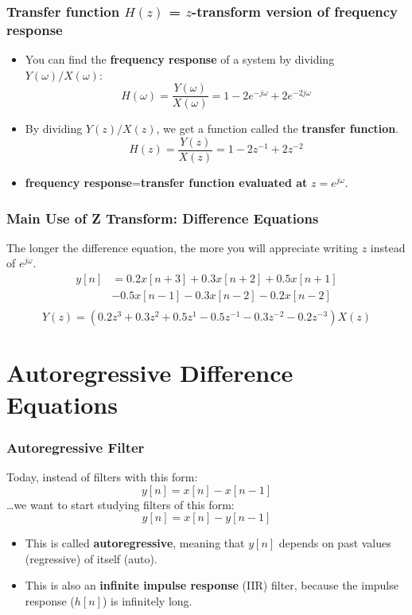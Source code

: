 \documentclass{beamer}
\begin{document}
\begin{frame}
  \frametitle{Transfer function $H(z)$ = $z$-transform version of frequency response}
  
  \begin{itemize}
  \item You can find the \textbf{frequency response} of a system by
    dividing $Y(\omega)/X(\omega)$:
    \[
    H(\omega)=\frac{Y(\omega)}{X(\omega)} = 1-2e^{-j\omega}+2e^{-2j\omega}
    \]
  \item By dividing $Y(z)/X(z)$, we get a function called the
    \textbf{transfer function}.  
    \[
    H(z) = \frac{Y(z)}{X(z)} = 1-2z^{-1}+2z^{-2}
    \]
  \item \textbf{frequency response}=\textbf{transfer function evaluated at} $z=e^{j\omega}$.
  \end{itemize}
\end{frame}

\begin{frame}
  \frametitle{Main Use of Z Transform: Difference Equations}
  
  The longer the difference equation, the more you will appreciate
  writing $z$ instead of $e^{j\omega}$.
  \begin{align*}
    y[n] &= 0.2x[n+3]+0.3x[n+2]+0.5x[n+1]\\
    &-0.5x[n-1]-0.3x[n-2]-0.2x[n-2]\\
  \end{align*}
  \[
  Y(z) = \left(0.2z^{3}+0.3z^{2}+0.5z^{1}-0.5z^{-1}-0.3z^{-2}-0.2z^{-3}\right)X(z)
  \]
\end{frame}


\section[Autoregressive]{Autoregressive Difference Equations}
\setcounter{subsection}{1}

\begin{frame}
  \frametitle{Autoregressive Filter}

  Today, instead of filters with this form:
  \begin{displaymath}
    y[n] = x[n]-x[n-1]
  \end{displaymath}
  \ldots we want to start studying filters of this form:
  \begin{displaymath}
    y[n] = x[n]-y[n-1]
  \end{displaymath}
  \begin{itemize}
  \item This is called {\bf autoregressive}, meaning that $y[n]$ depends on
    past values (regressive) of itself (auto).
  \item This is also an {\bf infinite impulse response} (IIR) filter, because
    the impulse response ($h[n]$) is infinitely long.
  \end{itemize}
\end{frame}
    
\end{document}
